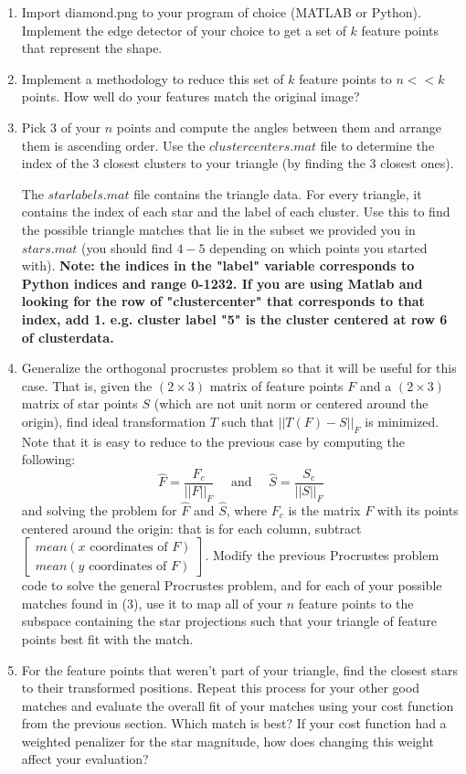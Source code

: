 \documentclass[paper=a4, fontsize=11pt]{scrartcl} %
\begin{document}
\begin{enumerate}
  \item
  Import diamond.png to your program of choice (MATLAB or Python). Implement the edge detector of your choice to get a set of $k$ feature points that represent the shape. 
  \item 
  Implement a methodology to reduce this set of $k$ feature points to $n << k$  points. How well do your features match the original image?
  \item
    Pick $3$ of your $n$ points and compute the angles between them and arrange them is ascending order. Use the $clustercenters.mat$ file to determine the index of the 3 closest clusters to your triangle (by finding the 3 closest ones).
    
    The $starlabels.mat$ file contains the triangle data. For every triangle, it contains the index of each star and the label of each cluster. Use this to find the possible triangle matches that lie in the subset we provided you in $stars.mat$ (you should find $4-5$ depending on which points you started with).  \textbf{Note: the indices in the "label" variable corresponds to Python indices and range 0-1232. If you are using Matlab and looking for the row of "clustercenter" that corresponds to that index, add 1. e.g. cluster label "5" is the cluster centered at row 6 of clusterdata.}
  \item
  Generalize the orthogonal procrustes problem so that it will be useful for this case. That is, given the $(2\times 3)$ matrix of feature points $F$ and a  $(2\times 3)$ matrix of star points $S$ (which are not unit norm or centered around the origin), find ideal transformation $T$ such that $||T(F)-S||_F$ is minimized.  Note that it is easy to reduce to the previous case by computing the following:
  $$
  \hat{F} = \frac{F_c}{||F||_F} \quad\textrm{ and }\quad\hat{S} = \frac{S_c}{||S||_F}
  $$
  and solving the problem for $\hat{F}$ and $\hat{S}$, where $F_c$ is the matrix $F$ with its points centered around the origin: that is for each column, subtract $\begin{bmatrix}
mean(x \textrm{ coordinates of } F)\\
mean(y \textrm{ coordinates of } F)
  \end{bmatrix}$. Modify the previous Procrustes problem code to solve the general Procrustes problem, and for each of your possible matches found in (3), use it to map all of your $n$ feature points to the subspace containing the star projections such that your triangle of feature points best fit with the match.
  \item
  For the feature points that weren't part of your triangle, find the closest stars to their transformed positions. Repeat this process for your other good matches and evaluate the overall fit of your matches using your cost function from the previous section. Which match is best? If your cost function had a weighted penalizer for the star magnitude, how does changing this weight affect your evaluation?
\end{enumerate}
\end{document}
